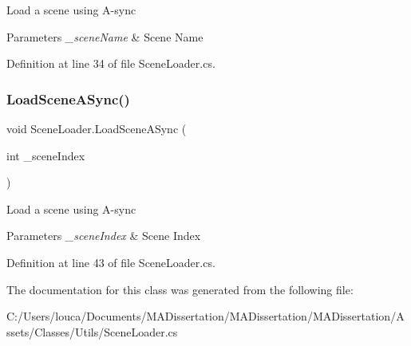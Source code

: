 Load a scene using A-\/sync 


\begin{DoxyParams}{Parameters}
{\em \+\_\+scene\+Name} & Scene Name\\
\hline
\end{DoxyParams}


Definition at line 34 of file Scene\+Loader.\+cs.

\mbox{\label{class_scene_loader_a13e9697bd4f96b57e215d179b85767f5}} 
\subsubsection{\texorpdfstring{Load\+Scene\+A\+Sync()}{LoadSceneASync()}\hspace{0.1cm}{\footnotesize\ttfamily [2/2]}}
{\footnotesize\ttfamily void Scene\+Loader.\+Load\+Scene\+A\+Sync (\begin{DoxyParamCaption}\item[{int}]{\+\_\+scene\+Index }\end{DoxyParamCaption})}



Load a scene using A-\/sync 


\begin{DoxyParams}{Parameters}
{\em \+\_\+scene\+Index} & Scene Index\\
\hline
\end{DoxyParams}


Definition at line 43 of file Scene\+Loader.\+cs.



The documentation for this class was generated from the following file\+:\begin{DoxyCompactItemize}
\item 
C\+:/\+Users/louca/\+Documents/\+M\+A\+Dissertation/\+M\+A\+Dissertation/\+M\+A\+Dissertation/\+Assets/\+Classes/\+Utils/Scene\+Loader.\+cs\end{DoxyCompactItemize}
